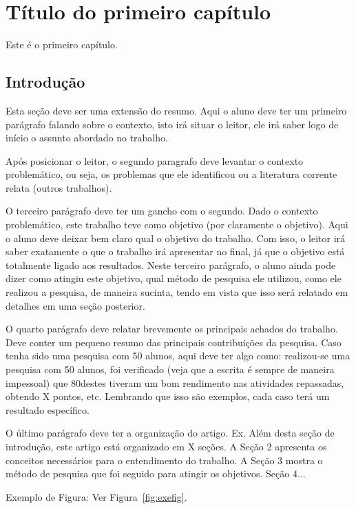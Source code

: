 \chapter{T\'itulo do primeiro cap\'itulo} \label{cap:cap1}

Este \'e o primeiro cap\'itulo. 

\section{Introdu\c{c}\~ao}\label{sec:intro}

Esta seção deve ser uma extensão do resumo. Aqui o aluno deve ter um primeiro parágrafo falando sobre o contexto, isto irá situar o leitor, ele irá saber logo de início o assunto abordado no trabalho.

Após posicionar o leitor, o segundo paragrafo deve levantar o contexto problemático, ou seja, os problemas que ele identificou ou a literatura corrente relata (outros trabalhos).

O terceiro parágrafo deve ter um gancho com o segundo. Dado o contexto problemático, este trabalho teve como objetivo (por claramente o objetivo). Aqui o aluno deve deixar bem claro qual o objetivo do trabalho. Com isso, o leitor irá saber exatamente o que o trabalho irá apresentar no final, já que o objetivo está totalmente ligado aos resultados. Neste terceiro parágrafo, o aluno ainda pode dizer como atingiu este objetivo, qual método de pesquisa ele utilizou, como ele realizou a pesquisa, de maneira sucinta, tendo em vista que isso será relatado em detalhes em uma seção posterior.

O quarto parágrafo deve relatar brevemente os principais achados do trabalho. Deve conter um pequeno resumo das principais contribuições da pesquisa. Caso tenha sido uma pesquisa com 50 alunos, aqui deve ter algo como: realizou-se uma pesquisa com 50 alunos, foi verificado (veja que a escrita é sempre de maneira impessoal) que 80\textdiscount  destes tiveram um bom rendimento nas atividades repassadas, obtendo X pontos, etc. Lembrando que isso são exemplos, cada caso terá um resultado específico. 

O último parágrafo deve ter a organização do artigo. Ex. Além desta seção de introdução, este artigo está organizado em X seções. A Seção 2 apresenta os conceitos necessários para o entendimento do trabalho. A Seção 3 mostra o método de pesquisa que foi seguido para atingir os objetivos. Seção 4...


Exemplo de Figura: Ver Figura~\ref{fig:exefig}.

